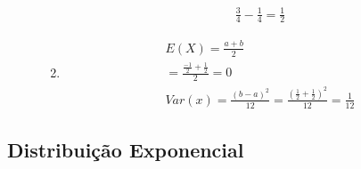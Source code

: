 \begin{description}
\begin{example}
\begin{enumerate}[label=(\alph*)]
\begin{align*}
        \frac{3}{4}- \frac{1}{4}= \frac{1}{2}
      \end{align*}
    \item 
      \begin{align*}
        E(X) = \frac{a+b}{2} \\
        = \frac{\frac{-1}{2} + \frac{1}{2}}{2}=0\\
        Var(x)= \frac{ \left( b-a \right)^2 }{12}= \frac{ \left( \frac{1}{2} + \frac{1}{2} \right)^2 }{12}= \frac{1}{12}
      \end{align*}
  \end{enumerate}
\end{example}
\end{description}
\subsection{Distribuição Exponencial}
